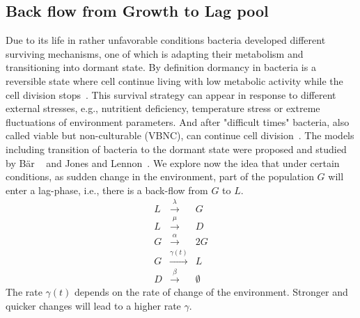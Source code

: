 \documentclass[10pt,A4paper]{article}
\begin{document}
\subsection{Back flow from Growth to Lag pool}
Due to its life in rather unfavorable conditions bacteria developed different surviving mechanisms, one of which is adapting their metabolism and transitioning into dormant state.
By definition dormancy in bacteria is a reversible state where cell continue living with low metabolic activity while the cell division stops~\cite{kaprelyants_dormancy_1993}.
This survival strategy can appear in response to different external stresses, e.g., nutritient deficiency, temperature stress or extreme fluctuations of environment parameters.
And after "difficult times" bacteria, also called viable but non-culturable (VBNC), can continue cell division~\cite{kell_viability_1998}.
The models including transition of bacteria to the dormant state were proposed and studied by Bär \etal~\cite{bar_modelling_2002} and Jones and Lennon~\cite{jones_dormancy_2010}.
%
%
We explore now the idea that under certain conditions, as sudden change in the environment, part of the population $G$ will enter a lag-phase, i.e., there is a back-flow from $G$ to $L$.
\begin{eqnarray}
    L &\stackrel{\lambda}{\longrightarrow} & G\\
    L &\stackrel{\mu}{\longrightarrow} & D\\
    G &\stackrel{\alpha}{\longrightarrow} & 2G\\
    G &\stackrel{\gamma(t)}{\longrightarrow} & L\\
    D &\stackrel{\beta}{\longrightarrow} & \emptyset
\end{eqnarray}
The rate $\gamma(t)$ depends on the rate of change of the environment.
Stronger and quicker changes will lead to a higher rate $\gamma$.
%
%
\end{document}
